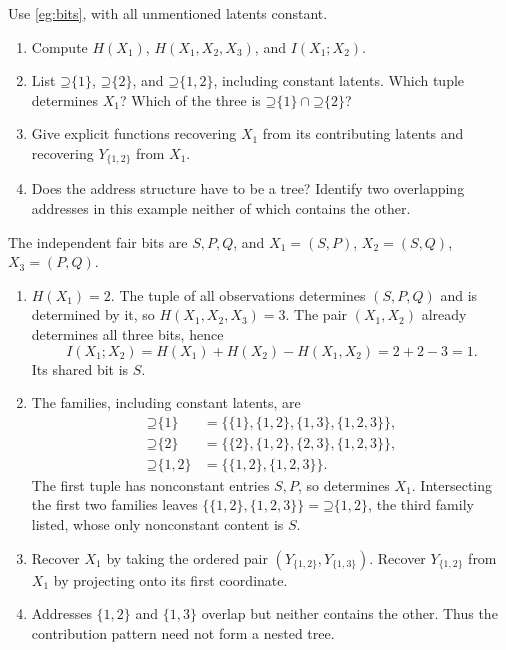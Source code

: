 \documentclass[11pt]{article}
\newcommand{\Up}{\mathord{\supseteq}}
\begin{document}
\begin{exercise}
\label{ex:bits}\important
Use \cref{eg:bits}, with all unmentioned latents constant.
\begin{enumerate}
\item Compute $H(X_1)$, $H(X_1,X_2,X_3)$, and $I(X_1;X_2)$.
\item List $\Up\{1\}$, $\Up\{2\}$, and $\Up\{1,2\}$, including
constant latents. Which tuple determines $X_1$? Which of the three is
$\Up\{1\}\cap\Up\{2\}$?
\item Give explicit functions recovering $X_1$ from its contributing latents
and recovering $Y_{\{1,2\}}$ from $X_1$.
\item Does the address structure have to be a tree? Identify two overlapping
addresses in this example neither of which contains the other.
\end{enumerate}
\end{exercise}
\begin{solution}[ex:bits]
The independent fair bits are $S,P,Q$, and
$X_1=(S,P)$, $X_2=(S,Q)$, $X_3=(P,Q)$.
\begin{enumerate}
\item $H(X_1)=2$. The tuple of all observations determines $(S,P,Q)$ and is
determined by it, so $H(X_1,X_2,X_3)=3$.
The pair $(X_1,X_2)$ already determines all three bits, hence
\[
 I(X_1;X_2)=H(X_1)+H(X_2)-H(X_1,X_2)=2+2-3=1.
\]
Its shared bit is $S$.
\item The families, including constant latents, are
\[
\begin{split}
 \Up\{1\}&=\{\{1\},\{1,2\},\{1,3\},\{1,2,3\}\},\\
 \Up\{2\}&=\{\{2\},\{1,2\},\{2,3\},\{1,2,3\}\},\\
 \Up\{1,2\}&=\{\{1,2\},\{1,2,3\}\}.
\end{split}
\]
The first tuple has nonconstant entries $S,P$, so determines $X_1$.
Intersecting the first two families leaves $\{\{1,2\},\{1,2,3\}\}=\Up\{1,2\}$,
the third family listed, whose only nonconstant content is $S$.
\item Recover $X_1$ by taking the ordered pair
$(Y_{\{1,2\}},Y_{\{1,3\}})$. Recover $Y_{\{1,2\}}$ from $X_1$ by
projecting onto its first coordinate.
\item Addresses $\{1,2\}$ and $\{1,3\}$ overlap but neither contains the
other. Thus the contribution pattern need not form a nested tree.
\end{enumerate}
\end{solution}
\end{document}

